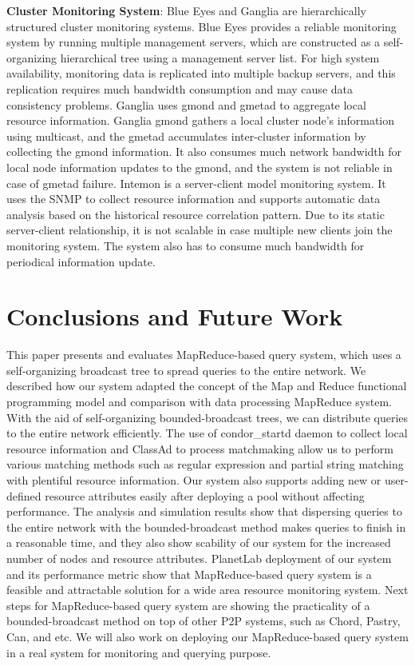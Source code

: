 \documentclass{acm_proc_article-sp}
\begin{document}
\textbf{Cluster Monitoring System}: Blue Eyes\cite{blueeyes} and Ganglia\cite{ganglia} are hierarchically structured cluster monitoring systems. 
Blue Eyes\cite{blueeyes} provides a reliable monitoring system by running multiple management servers, which are constructed as a self-organizing hierarchical tree using a management server list. 
For high system availability, monitoring data is replicated into multiple backup servers, and this replication requires much bandwidth consumption and may cause data consistency problems.
Ganglia\cite{ganglia} uses gmond and gmetad to aggregate local resource information. 
Ganglia gmond gathers a local cluster node's information using multicast, and the gmetad accumulates inter-cluster information by collecting the gmond information.
It also consumes much network bandwidth for local node information updates to the gmond, and the system is not reliable in case of gmetad failure.
Intemon\cite{intemon} is a server-client model monitoring system. It uses the SNMP to collect resource information and supports automatic data analysis based on the historical resource correlation pattern.
Due to its static server-client relationship, it is not scalable in case multiple new clients join the monitoring system. The system also has to consume much bandwidth for periodical information update.
\section{Conclusions and Future Work}
This paper presents and evaluates MapReduce-based query system, which uses a self-organizing broadcast tree to spread queries to the entire network.
We described how our system adapted the concept of the Map and Reduce functional programming model and comparison with data processing MapReduce system.
With the aid of self-organizing bounded-broadcast trees, we can distribute queries to the entire network efficiently. 
The use of condor\_startd daemon to collect local resource information and ClassAd to process matchmaking allow us to perform various matching methods such as regular expression and  partial string matching with plentiful resource information.
Our system also supports adding new or user-defined resource attributes easily after deploying a pool without affecting performance.
The analysis and simulation results show that dispersing queries to the entire network with the bounded-broadcast method makes queries to finish in a reasonable time, 
and they also show scability of our system for the increased number of nodes and resource attributes.
PlanetLab deployment of our system and its performance metric show that MapReduce-based query system is a feasible and attractable solution for a wide area resource monitoring system.
Next steps for MapReduce-based query system are showing the practicality of a bounded-broadcast method on top of other P2P systems, such as Chord, Pastry, Can, and etc.
We will also work on deploying our MapReduce-based query system in a real system for monitoring and querying purpose.




\balancecolumns
\end{document}
